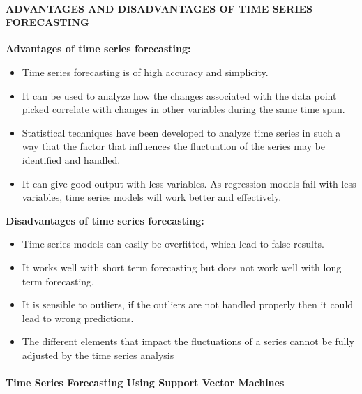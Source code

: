 \documentclass[
  letterpaper,
  DIV=11,
  numbers=noendperiod]{scrartcl}
\let\oldparagraph\paragraph
\renewcommand{\paragraph}[1]{\oldparagraph{#1}\mbox{}}
\begin{document}
\hypertarget{advantages-and-disadvantages-of-time-series-forecasting}{%
\paragraph{\texorpdfstring{\textsc{\textbf{ADVANTAGES AND DISADVANTAGES
OF TIME SERIES
FORECASTING}}}{ADVANTAGES AND DISADVANTAGES OF TIME SERIES FORECASTING}}\label{advantages-and-disadvantages-of-time-series-forecasting}}

\textbf{Advantages of time series forecasting:}

\begin{itemize}
\item
  Time series forecasting is of high accuracy and simplicity.
\item
  It can be used to analyze how the changes associated with the data
  point picked correlate with changes in other variables during the same
  time span.
\item
  Statistical techniques have been developed to analyze time series in
  such a way that the factor that influences the fluctuation of the
  series may be identified and handled.
\item
  It can give good output with less variables. As regression models fail
  with less variables, time series models will work better and
  effectively.
\end{itemize}

\textbf{Disadvantages of time series forecasting:}

\begin{itemize}
\item
  Time series models can easily be overfitted, which lead to false
  results.
\item
  It works well with short term forecasting but does not work well with
  long term forecasting.
\item
  It is sensible to outliers, if the outliers are not handled properly
  then it could lead to wrong predictions.
\item
  The different elements that impact the fluctuations of a series cannot
  be fully adjusted by the time series analysis
\end{itemize}

\hypertarget{time-series-forecasting-using-support-vector-machines}{%
\paragraph{\texorpdfstring{\textbf{Time Series Forecasting Using Support
Vector
Machines}}{Time Series Forecasting Using Support Vector Machines}}\label{time-series-forecasting-using-support-vector-machines}}
\end{document}
